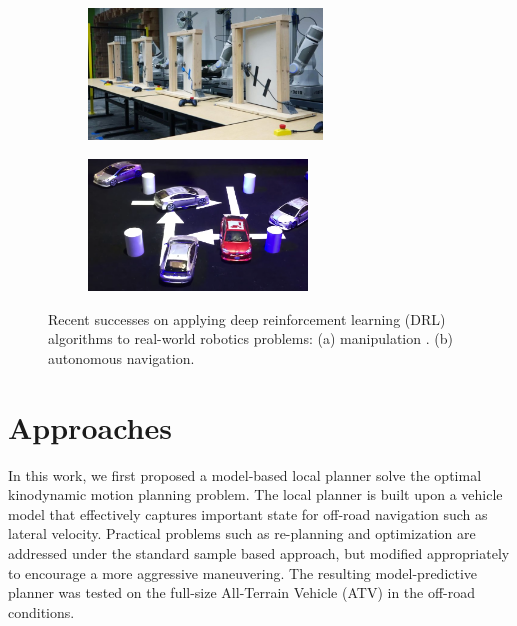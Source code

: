 \documentclass[../thesis.tex]{subfiles}
\begin{document}
\begin{figure}[b]
	\vskip -0.1in
    \centering
    \begin{subfigure}[b]{0.45\linewidth}
        \includegraphics[height=3.5cm]{./Introduction/drl_manipulation.jpg}
    \end{subfigure}
    \begin{subfigure}[b]{0.45\linewidth}
        \includegraphics[height=3.5cm]{./Introduction/drl_perfer_network.png}
    \end{subfigure}
    \caption{Recent successes on applying deep reinforcement learning (DRL) algorithms to real-world robotics problems: (a) manipulation \cite{gu2016deep}. (b) autonomous navigation. \cite{prefernetwork}}
    \label{fig:end-to-end}
\end{figure}


\section{Approaches}

In this work, we first proposed a model-based local planner solve the optimal kinodynamic motion planning problem. 
The local planner is built upon a vehicle model that effectively captures important state for off-road navigation such as lateral velocity. 
Practical problems such as re-planning and optimization are addressed under the standard sample based approach, but modified appropriately to encourage a more aggressive maneuvering. 
The resulting model-predictive planner was tested on the full-size All-Terrain Vehicle (ATV) in the off-road conditions.
\end{document}
